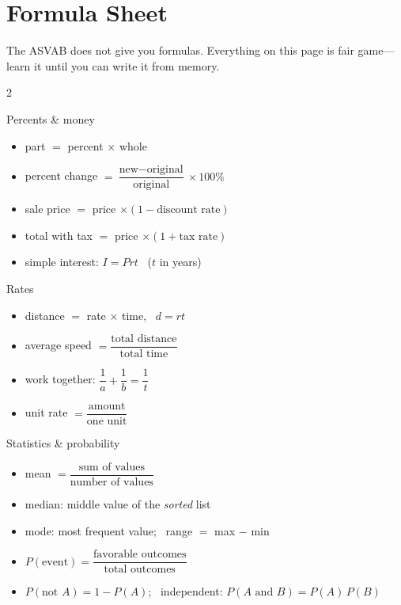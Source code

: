 \chapter*{Formula Sheet}

The ASVAB does not give you formulas. Everything on this page is fair
game---learn it until you can write it from memory.

{\small
{}
\begin{multicols}{2}
\begin{concept}{Percents \& money}
\begin{itemize}[leftmargin=1em]
\item part $=$ percent $\times$ whole
\item percent change $= \dfrac{\text{new}-\text{original}}{\text{original}}\times 100\%$
\item sale price $=$ price $\times (1 - \text{discount rate})$
\item total with tax $=$ price $\times (1 + \text{tax rate})$
\item simple interest: $I = Prt$ \ ($t$ in years)
\end{itemize}
\end{concept}

\begin{concept}{Rates}
\begin{itemize}[leftmargin=1em]
\item distance $=$ rate $\times$ time, \ $d = rt$
\item average speed $= \dfrac{\text{total distance}}{\text{total time}}$
\item work together: $\dfrac1a + \dfrac1b = \dfrac1t$
\item unit rate $= \dfrac{\text{amount}}{\text{one unit}}$
\end{itemize}
\end{concept}

\begin{concept}{Statistics \& probability}
\begin{itemize}[leftmargin=1em]
\item mean $= \dfrac{\text{sum of values}}{\text{number of values}}$
\item median: middle value of the \emph{sorted} list
\item mode: most frequent value; \ range $=$ max $-$ min
\item $P(\text{event}) = \dfrac{\text{favorable outcomes}}{\text{total outcomes}}$
\item $P(\text{not } A) = 1 - P(A)$; \ independent: $P(A \text{ and } B) = P(A)\,P(B)$
\end{itemize}
\end{concept}


\end{multicols}}
